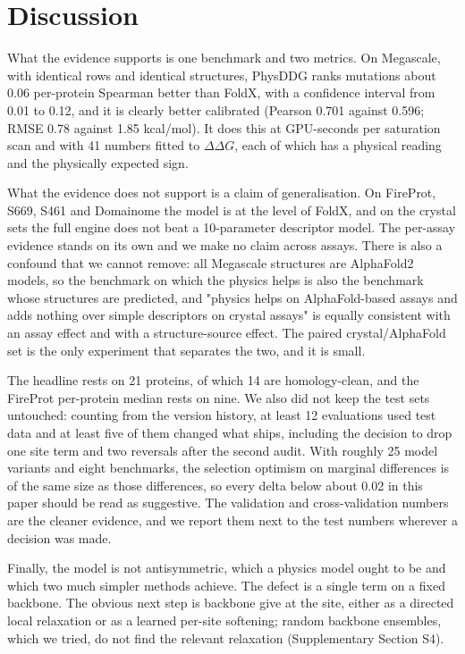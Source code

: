 \documentclass[unnumsec,webpdf,contemporary,large]{oup-authoring-template}
\begin{document}
\section{Discussion}
\label{sec:disc}

What the evidence supports is one benchmark and two metrics. On Megascale, with identical rows and identical
structures, PhysDDG ranks mutations about 0.06 per-protein Spearman better than FoldX, with a confidence
interval from 0.01 to 0.12, and it is clearly better calibrated (Pearson 0.701 against 0.596; RMSE 0.78 against
1.85 kcal/mol). It does this at GPU-seconds per saturation scan and with 41 numbers fitted to $\Delta\Delta G$,
each of which has a physical reading and the physically expected sign.

What the evidence does not support is a claim of generalisation. On FireProt, S669, S461 and Domainome the model
is at the level of FoldX, and on the crystal sets the full engine does not beat a 10-parameter descriptor model.
The per-assay evidence stands on its own and we make no claim across assays. There is also a confound that we cannot
remove: all Megascale structures are AlphaFold2 models, so the benchmark on which the physics helps is also the
benchmark whose structures are predicted, and "physics helps on AlphaFold-based assays and adds nothing over
simple descriptors on crystal assays" is equally consistent with an assay effect and with a structure-source
effect. The paired crystal/AlphaFold set is the only experiment that separates the two, and it is small.

The headline rests on 21 proteins, of which 14 are homology-clean, and the FireProt per-protein median rests on
nine. We also did not keep the test sets untouched: counting from the version history, at least 12 evaluations
used test data and at least five of them changed what ships, including the decision to drop one site term and
two reversals after the second audit. With roughly 25 model variants and eight benchmarks, the selection
optimism on marginal differences is of the same size as those differences, so every delta below about 0.02 in
this paper should be read as suggestive. The validation and cross-validation numbers are the cleaner evidence,
and we report them next to the test numbers wherever a decision was made.

Finally, the model is not antisymmetric, which a physics model ought to be and which two much simpler methods
achieve. The defect is a single term on a fixed backbone. The obvious next step is backbone give at the site,
either as a directed local relaxation or as a learned per-site softening; random backbone ensembles, which we
tried, do not find the relevant relaxation (Supplementary Section S4).
\end{document}
